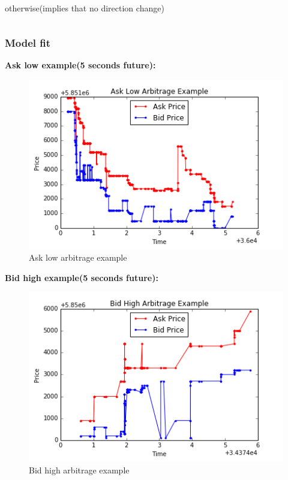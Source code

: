 \documentclass[xcolor={x11names,svgnames,dvipsnames}]{beamer}
\begin{document}
\begin{frame}
\begin{columns}
\begin{column}{.5\textwidth}
\begin{itemize}
			\\
			\subitem\textbullet  otherwise(implies that \alert{no direction} change)
			\end{itemize}
		\end{column}
	\end{columns}
\end{frame}


\begin{frame}
\frametitle{Model fit}
\textbf{Ask low example(5 seconds future):}
\begin{figure}
\centering
\includegraphics[width=0.7\linewidth]{./ask_low_example}
\caption{Ask low arbitrage example}
\label{fig:ask_low_example}
\end{figure}

\end{frame}

\begin{frame}

\textbf{Bid high example(5 seconds future):}
\begin{figure}
\centering
\includegraphics[width=0.7\linewidth]{./bid_high_example}
\caption{Bid high arbitrage example}
\label{fig:bid_low_example}
\end{figure}

\end{frame}
\end{document}
